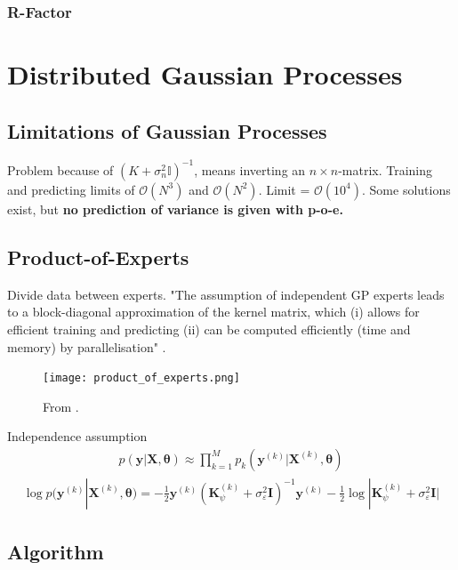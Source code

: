 \documentclass[twoside,english]{uiofysmaster}
\begin{document}
\subsubsection{R-Factor}



\section{Distributed Gaussian Processes}

\subsection{Limitations of Gaussian Processes}

Problem because of $(K + \sigma_n^2 \mathbb{I})^{-1}$, means inverting an $n \times n$-matrix. Training and predicting limits of $\mathcal{O}(N^3)$ and $\mathcal{O}(N^2)$. Limit = $\mathcal{O}(10^4)$. Some solutions exist, but \textbf{no prediction of variance is given with p-o-e.}

\subsection{Product-of-Experts}

Divide data between experts. "The assumption of independent GP experts leads to a
block-diagonal approximation of the kernel matrix, which
(i) allows for efficient training and predicting (ii) can be
computed efficiently (time and memory) by parallelisation" \cite{deisenroth2015distributed}.

\begin{figure}
\centering
\texttt{[image: product\_of\_experts.png]}
\caption{From \cite{deisenroth2015distributed}.}
\end{figure}

Independence assumption
\begin{align}
p(\textbf{y} | \textbf{X}, \boldsymbol{\theta}) \approx \prod_{k=1}^M p_k(\textbf{y}^{(k)} | \textbf{X}^{(k)}, \boldsymbol{\theta}) 
\end{align}
\begin{align}
\log p(\textbf{y}^{(k)}|\textbf{X}^{(k)}, \boldsymbol{\theta}) = - \frac{1}{2} \textbf{y}^{(k)} (\textbf{K}_{\psi}^{(k)} + \sigma_{\varepsilon}^2 \textbf{I})^{-1}\textbf{y}^{(k)} - \frac{1}{2} \log
 |\textbf{K}_{\psi}^{(k)} + \sigma_{\varepsilon}^2 \textbf{I} |
\end{align}


\subsection{Algorithm}
\end{document}
